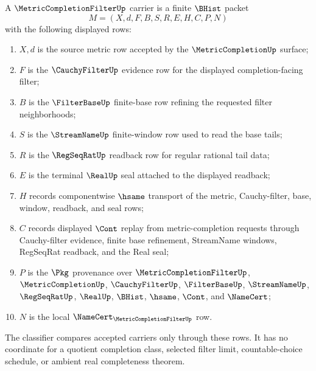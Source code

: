 \begin{definition}
\label{def:metric-completion-filter-carrier}
A $\MetricCompletionFilterUp$ carrier is a finite $\BHist$ packet
$$
M=(X,d,F,B,S,R,E,H,C,P,N)
$$
with the following displayed rows:
\begin{enumerate}
\item $X,d$ is the source metric row accepted by the $\MetricCompletionUp$ surface;
\item $F$ is the $\CauchyFilterUp$ evidence row for the displayed completion-facing filter;
\item $B$ is the $\FilterBaseUp$ finite-base row refining the requested filter neighborhoods;
\item $S$ is the $\StreamNameUp$ finite-window row used to read the base tails;
\item $R$ is the $\RegSeqRatUp$ readback row for regular rational tail data;
\item $E$ is the terminal $\RealUp$ seal attached to the displayed readback;
\item $H$ records componentwise $\hsame$ transport of the metric, Cauchy-filter, base, window, readback, and seal rows;
\item $C$ records displayed $\Cont$ replay from metric-completion requests through Cauchy-filter evidence, finite base refinement, StreamName windows, RegSeqRat readback, and the Real seal;
\item $P$ is the $\Pkg$ provenance over $\MetricCompletionFilterUp$, $\MetricCompletionUp$, $\CauchyFilterUp$, $\FilterBaseUp$, $\StreamNameUp$, $\RegSeqRatUp$, $\RealUp$, $\BHist$, $\hsame$, $\Cont$, and $\NameCert$;
\item $N$ is the local $\NameCert_{\MetricCompletionFilterUp}$ row.
\end{enumerate}
The classifier compares accepted carriers only through these rows. It has no coordinate for a quotient completion class, selected filter limit, countable-choice schedule, or ambient real completeness theorem.
\end{definition}

